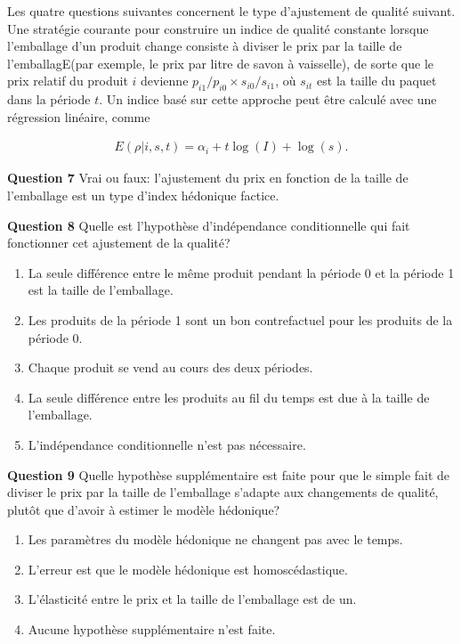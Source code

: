 \documentclass[]{article}
\begin{document}
Les quatre questions suivantes concernent le type d'ajustement de qualité suivant. Une stratégie courante pour construire un indice de qualité constante lorsque l'emballage d'un produit change consiste à diviser le prix par la taille de l'emballagE(par exemple, le prix par litre de savon à vaisselle), de sorte que le prix relatif du produit \(i\) devienne \(p_{i1} / p_{i0} \times s_{i0} / s_{i1}\), où \(s_{it}\) est la taille du paquet dans la période \(t\). Un indice basé sur cette approche peut être calculé avec une régression linéaire, comme

\begin{align*}
E(\rho | i, s, t) = \alpha_i + t \log(I) + \log(s).
\end{align*}

\textbf{Question 7} Vrai ou faux: l'ajustement du prix en fonction de la taille de l'emballage est un type d'index hédonique factice.

\textbf{Question 8} Quelle est l'hypothèse d'indépendance conditionnelle qui fait fonctionner cet ajustement de la qualité?

\begin{enumerate}
\def\labelenumi{\alph{enumi})}
\item
  La seule différence entre le même produit pendant la période 0 et la période 1 est la taille de l'emballage.
\item
  Les produits de la période 1 sont un bon contrefactuel pour les produits de la période 0.
\item
  Chaque produit se vend au cours des deux périodes.
\item
  La seule différence entre les produits au fil du temps est due à la taille de l'emballage.
\item
  L'indépendance conditionnelle n'est pas nécessaire.
\end{enumerate}

\textbf{Question 9} Quelle hypothèse supplémentaire est faite pour que le simple fait de diviser le prix par la taille de l'emballage s'adapte aux changements de qualité, plutôt que d'avoir à estimer le modèle hédonique?

\begin{enumerate}
\def\labelenumi{\alph{enumi})}
\item
  Les paramètres du modèle hédonique ne changent pas avec le temps.
\item
  L'erreur est que le modèle hédonique est homoscédastique.
\item
  L'élasticité entre le prix et la taille de l'emballage est de un.
\item
  Aucune hypothèse supplémentaire n'est faite.
\end{enumerate}
\end{document}
